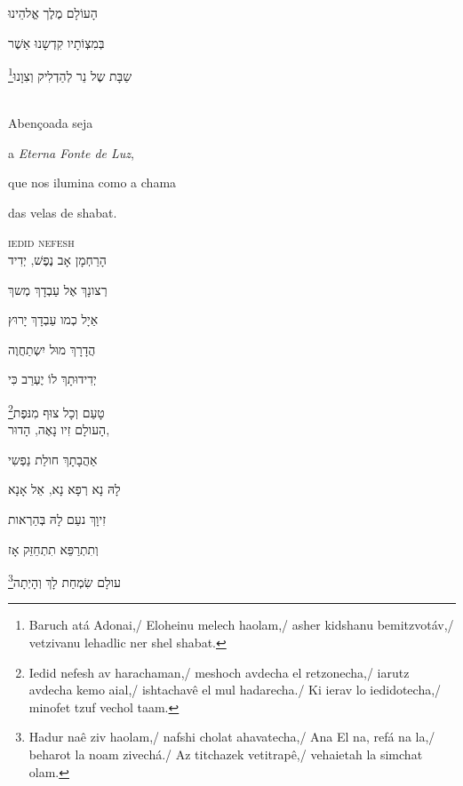 הָעוֹלָם מֶלֶך אֱלהֵינוּ

בְּמִצְוֹתָיו קִדְשָנוּ אַשֶׁר

שַבָּת שֶל נֵר לְהַדְלִיק וְצִוָנוּ‏\footnote{Baruch atá Adonai,/ Eloheinu melech haolam,/ asher kidshanu bemitzvotáv,/ vetzivanu lehadlic ner shel shabat.}

\movetooddpage
\raggedright

\vspace*{1cm}

\textsc{}\\[15pt]

Abençoada seja

a \emph{Eterna Fonte de Luz}, 

que nos ilumina como a chama

das velas de shabat. 


\movetoevenpage
\raggedleft

\vspace*{1cm}

\textsc{iedid nefesh}\\[15pt]

הָרַחְמָן אָב נֶפֶשׁ, יְדִיד 

רְצונָךְ אֶל עַבְדָךְ מְשךְ 

אַיָל כְמו עַבְדָךְ יָרוּץ 

הֲדָרָךְ מוּל יִשְתַחֲוֶה 

יְדִידוּתָךְ לוֹ יֶעְרַב כִּי 

טָעַם וְכָל צוּף מִנּפֶת\footnote{Iedid nefesh av harachaman,/ meshoch avdecha el retzonecha,/ iarutz avdecha kemo aial,/ ishtachavê el mul hadarecha./ Ki ierav lo iedidotecha,/ minofet tzuf vechol taam.}\\[10pt]

הָעולָם זִיו נָאֶה, הָדוּר,

אַהֲבָתָךְ חולַת נַפְשִי 

לָהּ נָא רְפָא נָא, אֵל אָנָא 

זִיוָךְ נעַם לָהּ בְּהַרְאות

וְתִתְרַפֵּא תִתְחֵזֵּק אָז

עולָם שִׂמְחַת לָךְ וְהָיְתָה\footnote{Hadur naê ziv haolam,/ nafshi cholat ahavatecha,/ Ana El na, refá na la,/ beharot la noam zivechá./ Az titchazek vetitrapê,/ vehaietah la simchat olam.}\\[10pt]


\movetooddpage
\raggedright

\vspace*{1cm}

